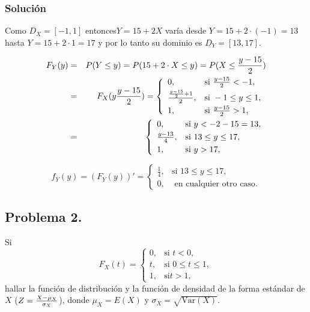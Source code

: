 \documentclass[]{article}
\begin{document}
{{\hypertarget{soluciuxf3n-11}{%
\subsubsection{Solución}\label{soluciuxf3n-11}}

Como \(D_X=[-1,1]\) entonces\(Y=15+2 X\) varía desde
\(Y=15+2\cdot (-1)=13\) hasta \(Y=15+2\cdot 1=17\) y por lo tanto su
dominio es \(D_Y=[13,17].\)

\begin{eqnarray*}
F_Y(y)&=& P(Y\leq y) =P(15+2\cdot X\leq y )=P(X\leq \frac{y-15}{2})
\\&=& 
F_X(y\frac{y-15}{2})=
\left\{\begin{array}{ll}
0, & \mbox{si } \frac{y-15}{2}<-1,
\\[0.1cm]
{\frac{y-15}{2}+1\over 2}, & \mbox{si } -1\leq y \leq
1,
 \\[0.1cm]
1, & \mbox{si } \frac{y-15}{2}>1,
\end{array}\right.
\\&=& 
\left\{\begin{array}{ll}
0, & \mbox{si } y<-2-15=13
,
\\[0.1cm]
\frac{y-13}{4}, & \mbox{si } 13\leq y \leq
17,
 \\[0.1cm]
1, & \mbox{si } y>17,
\end{array}\right.
\end{eqnarray*}

\[
f_Y(y)=(F_Y(y))'=
\left\{\begin{array}{ll}
\frac{1}{4}, & \mbox{si } 13\leq y \leq
17,
 \\[0.1cm]
0, & \mbox{ en cualquier otro caso}.
\end{array}\right.
\]

\hypertarget{problema-2.-2}{%
\subsection{Problema 2.}\label{problema-2.-2}}

Si \[
F_X(t)=
\left\{\begin{array}{ll}
0, & \mbox{si $t<0$},\\ t, &
\mbox{si $0\leq t\leq 1$},\\ 1, & \mbox{si
$t>1$},
\end{array}\right.
\] hallar la función de distribución y la función de densidad de la
forma estándar de \(X\) (\(Z={X-\mu_X\over \sigma_X}\)), donde
\(\mu_X =E(X)\) y \(\sigma_X=\sqrt{\mathrm{Var}(X)}\).

}}
\end{document}
